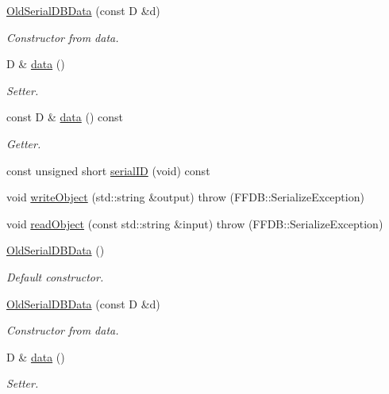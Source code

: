 \begin{DoxyCompactItemize}
\mbox{\hyperlink{classADATIO_1_1OldSerialDBData_ada293b92b5081fbb6e82364196ff5524}{Old\+Serial\+D\+B\+Data}} (const D \&d)
\begin{DoxyCompactList}\small\item\em Constructor from data. \end{DoxyCompactList}\item 
D \& \mbox{\hyperlink{classADATIO_1_1OldSerialDBData_ad917fd5898616290b7c0d30cb878850f}{data}} ()
\begin{DoxyCompactList}\small\item\em Setter. \end{DoxyCompactList}\item 
const D \& \mbox{\hyperlink{classADATIO_1_1OldSerialDBData_a4d5c8f72f1f572f26127f728b202e345}{data}} () const
\begin{DoxyCompactList}\small\item\em Getter. \end{DoxyCompactList}\item 
const unsigned short \mbox{\hyperlink{classADATIO_1_1OldSerialDBData_a379c8edee426f2a5ce3f41d0c46777de}{serial\+ID}} (void) const
\item 
void \mbox{\hyperlink{classADATIO_1_1OldSerialDBData_aec52af4bfb6beb74fc039b9b25328270}{write\+Object}} (std\+::string \&output)  throw (\+F\+F\+D\+B\+::\+Serialize\+Exception)
\item 
void \mbox{\hyperlink{classADATIO_1_1OldSerialDBData_aad0338cd19224fe3eb6223afe7e2c2c4}{read\+Object}} (const std\+::string \&input)  throw (\+F\+F\+D\+B\+::\+Serialize\+Exception)
\item 
\mbox{\hyperlink{classADATIO_1_1OldSerialDBData_a189c0c4ac35db492b9cbc68deb15c5dd}{Old\+Serial\+D\+B\+Data}} ()
\begin{DoxyCompactList}\small\item\em Default constructor. \end{DoxyCompactList}\item 
\mbox{\hyperlink{classADATIO_1_1OldSerialDBData_ada293b92b5081fbb6e82364196ff5524}{Old\+Serial\+D\+B\+Data}} (const D \&d)
\begin{DoxyCompactList}\small\item\em Constructor from data. \end{DoxyCompactList}\item 
D \& \mbox{\hyperlink{classADATIO_1_1OldSerialDBData_ad917fd5898616290b7c0d30cb878850f}{data}} ()
\begin{DoxyCompactList}\small\item\em Setter. \end{DoxyCompactList}\item 

\end{DoxyCompactItemize}
